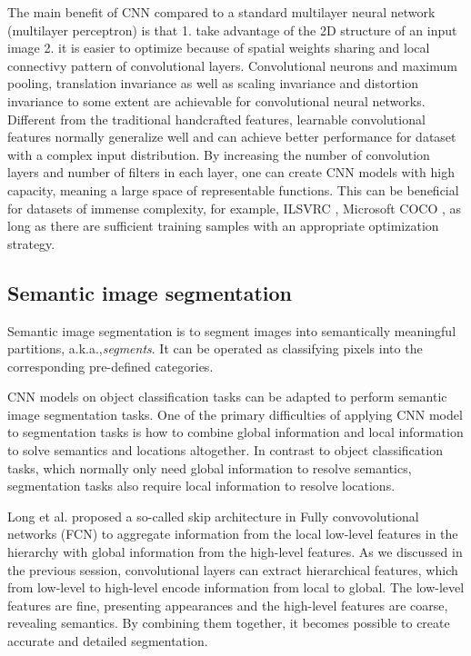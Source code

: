 
The main benefit of CNN compared to a standard multilayer neural network (multilayer perceptron) is that
1. take advantage of the 2D structure of an input image
2. it is easier to optimize because of spatial weights sharing and local connectivy pattern of convolutional layers.
Convolutional neurons and maximum pooling, translation invariance as well as scaling invariance and distortion invariance to some extent are achievable for convolutional neural networks. \cite{lecun1998gradient}
Different from the traditional handcrafted features, learnable convolutional features normally generalize well and can achieve better performance for dataset with a complex input distribution. \cite{krizhevsky2012imagenet}
By increasing the number of convolution layers and number of filters in each layer, one can create CNN models with high capacity, meaning a large space of representable functions.
This can be beneficial for datasets of immense complexity, for example, ILSVRC \cite{russakovsky2015imagenet}, Microsoft COCO \cite{lin2014microsoft}, as long as there are sufficient training samples with an appropriate optimization strategy.


\subsection{Semantic image segmentation}
\label{subsec:segmentation}


Semantic image segmentation is to segment images into semantically meaningful partitions, a.k.a.,\textit{segments}.
It can be operated as classifying pixels into the corresponding pre-defined categories.


CNN models on object classification tasks can be adapted to perform semantic image segmentation tasks. \cite{long2015fully}
One of the primary difficulties of applying CNN model to segmentation tasks is how to combine global information and local information to solve semantics and locations altogether.
In contrast to object classification tasks, which normally only need global information to resolve semantics, segmentation tasks also require local information to resolve locations.


Long et al. \cite{long2015fully} proposed a so-called skip architecture in Fully convovolutional networks (FCN) to aggregate information from the local low-level features in the hierarchy with global information from the high-level features.
As we discussed in the previous session, convolutional layers can extract hierarchical features, which from low-level to high-level encode information from local to global.
The low-level features are fine, presenting appearances and the high-level features are coarse, revealing semantics.
By combining them together, it becomes possible to create accurate and detailed segmentation.


